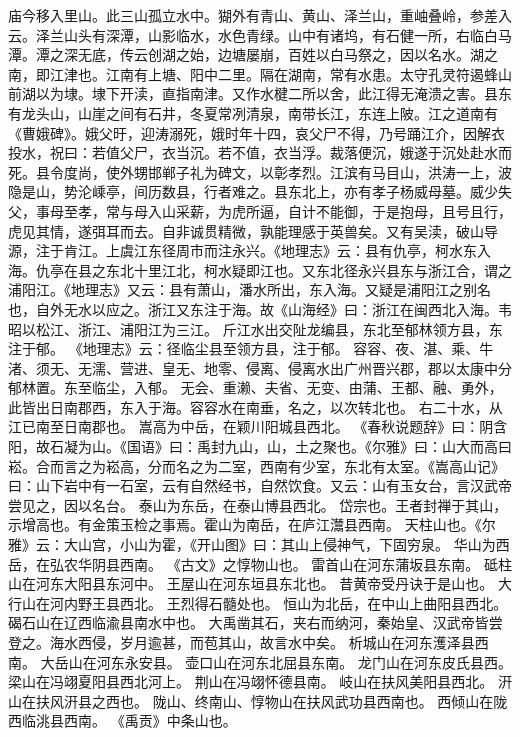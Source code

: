 \documentclass[12pt,UTF8]{ctexbook}
\begin{document}
庙今移入里山。此三山孤立水中。猢外有青山、黄山、泽兰山，重岫叠岭，参差入云。泽兰山头有深潭，山影临水，水色青绿。山中有诸坞，有石健一所，右临白马潭。潭之深无底，传云创湖之始，边塘屡崩，百姓以白马祭之，因以名水。湖之南，即江津也。江南有上塘、阳中二里。隔在湖南，常有水患。太守孔灵符遏蜂山前湖以为埭。埭下开渎，直指南津。又作水楗二所以舍，此江得无淹溃之害。县东有龙头山，山崖之间有石井，冬夏常冽清泉，南带长江，东连上陂。江之道南有《曹娥碑》。娥父旴，迎涛溺死，娥时年十四，哀父尸不得，乃号踊江介，因解衣投水，祝曰：若值父尸，衣当沉。若不值，衣当浮。裁落便沉，娥遂于沉处赴水而死。县令度尚，使外甥邯郸子礼为碑文，以彰孝烈。江滨有马目山，洪涛一上，波隐是山，势沦嵊亭，间历数县，行者难之。县东北上，亦有孝子杨威母墓。威少失父，事母至孝，常与母入山采薪，为虎所逼，自计不能御，于是抱母，且号且行，虎见其情，遂弭耳而去。自非诚贯精微，孰能理感于英兽矣。又有吴渎，破山导源，注于肯江。上虞江东径周市而注永兴。《地理志》云：县有仇亭，柯水东入海。仇亭在县之东北十里江北，柯水疑即江也。又东北径永兴县东与浙江合，谓之浦阳江。《地理志》又云：县有萧山，潘水所出，东入海。又疑是浦阳江之别名也，自外无水以应之。浙江又东注于海。故《山海经》曰：浙江在闽西北入海。韦昭以松江、浙江、浦阳江为三江。
斤江水出交阯龙编县，东北至郁林领方县，东注于郁。
《地理志》云：径临尘县至领方县，注于郁。
容容、夜、湛、乘、牛渚、须无、无濡、营进、皇无、地零、侵离、侵离水出广州晋兴郡，郡以太康中分郁林置。东至临尘，入郁。
无会、重濑、夫省、无变、由蒲、王都、融、勇外，此皆出日南郡西，东入于海。容容水在南垂，名之，以次转北也。
右二十水，从江已南至日南郡也。
嵩高为中岳，在颖川阳城县西北。
《春秋说题辞》曰：阴含阳，故石凝为山。《国语》曰：禹封九山，山，土之聚也。《尔雅》曰：山大而高曰崧。合而言之为崧高，分而名之为二室，西南有少室，东北有太室。《嵩高山记》曰：山下岩中有一石室，云有自然经书，自然饮食。又云：山有玉女台，言汉武帝尝见之，因以名台。
泰山为东岳，在泰山博县西北。
岱宗也。王者封禅于其山，示增高也。有金策玉检之事焉。霍山为南岳，在庐江灊县西南。
天柱山也。《尔雅》云：大山宫，小山为霍，《开山图》曰：其山上侵神气，下固穷泉。
华山为西岳，在弘农华阴县西南。
《古文》之惇物山也。
雷首山在河东蒲坂县东南。
砥柱山在河东大阳县东河中。
王屋山在河东垣县东北也。
昔黄帝受丹诀于是山也。
大行山在河内野王县西北。
王烈得石髓处也。
恒山为北岳，在中山上曲阳县西北。
碣石山在辽西临渝县南水中也。
大禹凿其石，夹右而纳河，秦始皇、汉武帝皆尝登之。海水西侵，岁月逾甚，而苞其山，故言水中矣。
析城山在河东濩泽县西南。
大岳山在河东永安县。
壶口山在河东北屈县东南。
龙门山在河东皮氏县西。
梁山在冯翊夏阳县西北河上。
荆山在冯翊怀德县南。
岐山在扶风美阳县西北。
汧山在扶风汧县之西也。
陇山、终南山、惇物山在扶风武功县西南也。
西倾山在陇西临洮县西南。
《禹贡》中条山也。
\end{document}
